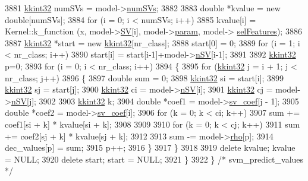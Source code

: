 \begin{DoxyCode}
3881     \hyperlink{namespace_k_k_b_a8fa4952cc84fda1de4bec1fbdd8d5b1b}{kkint32} numSVs = model->\hyperlink{struct_s_v_m289___m_f_s_1_1_svm___model_a9d1cb317006096158440daf45c809f0c}{numSVs};
3882     
3883     \textcolor{keywordtype}{double} *kvalue = \textcolor{keyword}{new} \textcolor{keywordtype}{double}[numSVs];
3884     \textcolor{keywordflow}{for}  (i = 0;  i < numSVs;  i++)
3885       kvalue[i] = Kernel::k\_function (x, model->\hyperlink{struct_s_v_m289___m_f_s_1_1_svm___model_ab2ebe759ca5aabb85fc6deea03706f0a}{SV}[i], model->\hyperlink{struct_s_v_m289___m_f_s_1_1_svm___model_af44a309facec24212604b219dc411582}{param}, model->
      \hyperlink{struct_s_v_m289___m_f_s_1_1_svm___model_a9a7868a9a65154d09d596dd97fb875a2}{selFeatures});
3886 
3887     \hyperlink{namespace_k_k_b_a8fa4952cc84fda1de4bec1fbdd8d5b1b}{kkint32} *start = \textcolor{keyword}{new} \hyperlink{namespace_k_k_b_a8fa4952cc84fda1de4bec1fbdd8d5b1b}{kkint32}[nr\_class];
3888     start[0] = 0;
3889     \textcolor{keywordflow}{for}  (i = 1;  i < nr\_class;  i++)
3890       start[i] = start[i-1]+model->\hyperlink{struct_s_v_m289___m_f_s_1_1_svm___model_a99c49e2824661c212c1599dcd636d2c0}{nSV}[i-1];
3891 
3892     \hyperlink{namespace_k_k_b_a8fa4952cc84fda1de4bec1fbdd8d5b1b}{kkint32}  p=0;
3893     for  (i = 0;  i < nr\_class;  i++)
3894     \{
3895       \textcolor{keywordflow}{for}  (\hyperlink{namespace_k_k_b_a8fa4952cc84fda1de4bec1fbdd8d5b1b}{kkint32} j = i + 1;  j < nr\_class;  j++)
3896       \{
3897         \textcolor{keywordtype}{double} sum = 0;
3898         \hyperlink{namespace_k_k_b_a8fa4952cc84fda1de4bec1fbdd8d5b1b}{kkint32} si = start[i];
3899         \hyperlink{namespace_k_k_b_a8fa4952cc84fda1de4bec1fbdd8d5b1b}{kkint32} sj = start[j];
3900         \hyperlink{namespace_k_k_b_a8fa4952cc84fda1de4bec1fbdd8d5b1b}{kkint32} ci = model->\hyperlink{struct_s_v_m289___m_f_s_1_1_svm___model_a99c49e2824661c212c1599dcd636d2c0}{nSV}[i];
3901         \hyperlink{namespace_k_k_b_a8fa4952cc84fda1de4bec1fbdd8d5b1b}{kkint32} cj = model->\hyperlink{struct_s_v_m289___m_f_s_1_1_svm___model_a99c49e2824661c212c1599dcd636d2c0}{nSV}[j];
3902         
3903         \hyperlink{namespace_k_k_b_a8fa4952cc84fda1de4bec1fbdd8d5b1b}{kkint32} k;
3904         \textcolor{keywordtype}{double} *coef1 = model->\hyperlink{struct_s_v_m289___m_f_s_1_1_svm___model_afc428150716a2373a251c57f7e68bad3}{sv\_coef}[j - 1];
3905         \textcolor{keywordtype}{double} *coef2 = model->\hyperlink{struct_s_v_m289___m_f_s_1_1_svm___model_afc428150716a2373a251c57f7e68bad3}{sv\_coef}[i];
3906         \textcolor{keywordflow}{for}  (k = 0;  k < ci;  k++)
3907           sum += coef1[si + k] * kvalue[si + k];
3908 
3909 
3910         \textcolor{keywordflow}{for}  (k = 0;  k < cj;  k++)
3911           sum += coef2[sj + k] * kvalue[sj + k];
3912 
3913         sum -= model->\hyperlink{struct_s_v_m289___m_f_s_1_1_svm___model_ac6ee5562a25222e436bb29497cc98525}{rho}[p];
3914         dec\_values[p] = sum;
3915         p++;
3916       \}
3917     \}
3918 
3919     \textcolor{keyword}{delete}  kvalue;   kvalue = NULL;
3920     \textcolor{keyword}{delete}  start;    start  = NULL;
3921   \}
3922 \}  \textcolor{comment}{/* svm\_predict\_values */}
\end{DoxyCode}
